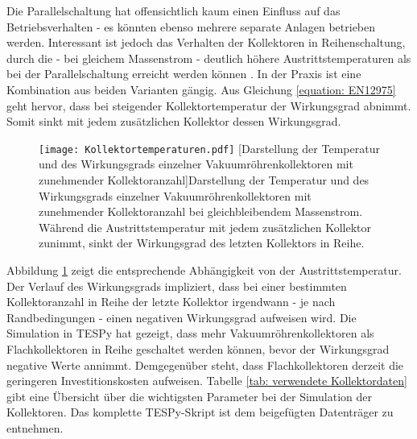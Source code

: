 Die Parallelschaltung hat offensichtlich kaum einen Einfluss auf das Betriebsverhalten - es könnten ebenso mehrere separate Anlagen betrieben werden. Interessant ist jedoch das Verhalten der Kollektoren in Reihenschaltung, durch die - bei gleichem Massenstrom - deutlich höhere Austrittstemperaturen als bei der Parallelschaltung erreicht werden können \cite{Watter2013}. In der Praxis ist eine Kombination aus beiden Varianten gängig.  
Aus Gleichung \ref{equation: EN12975} geht hervor, dass bei steigender Kollektortemperatur der Wirkungsgrad abnimmt. Somit sinkt mit jedem zusätzlichen Kollektor dessen Wirkungsgrad.
	\begin{figure}
		\centering
		\texttt{[image: Kollektortemperaturen.pdf]}
		[Darstellung der Temperatur und des Wirkungsgrads einzelner Vakuumröhrenkollektoren mit zunehmender Kollektoranzahl]{Darstellung der Temperatur und des Wirkungsgrads einzelner Vakuumröhrenkollektoren mit zunehmender Kollektoranzahl bei gleichbleibendem Massenstrom. Während die Austrittstemperatur mit jedem zusätzlichen Kollektor zunimmt, sinkt der Wirkungsgrad des letzten Kollektors in Reihe.}
		\label{fig: Kollektortemperatur und Wirkungsgrad über Kollektoranzahl}
	\end{figure}
Abbildung \ref{fig: Kollektortemperatur und Wirkungsgrad über Kollektoranzahl} zeigt die entsprechende Abhängigkeit von der Austrittstemperatur. Der Verlauf des Wirkungsgrads impliziert, dass bei einer bestimmten Kollektoranzahl in Reihe der letzte Kollektor irgendwann - je nach Randbedingungen - einen negativen Wirkungsgrad aufweisen wird. Die Simulation in TESPy hat gezeigt, dass mehr Vakuumröhrenkollektoren als Flachkollektoren in Reihe geschaltet werden können, bevor der Wirkungsgrad negative Werte annimmt. Demgegenüber steht, dass Flachkollektoren derzeit die geringeren Investitionskosten aufweisen. Tabelle \ref{tab: verwendete Kollektordaten} gibt eine Übersicht über die wichtigsten Parameter bei der Simulation der Kollektoren. Das komplette \ac{TESPy}-Skript ist dem beigefügten Datenträger zu entnehmen.

